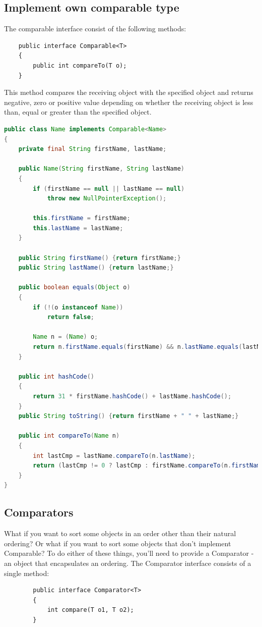 \subsection{Implement own comparable type}
The comparable interface consist of the following methods:
\begin{lstlisting}
	public interface Comparable<T>
	{
		public int compareTo(T o);
	}
\end{lstlisting}

This method compares the receiving object with the specified object and returns negative, zero or positive value depending on whether the receiving object is less than, equal or greater than the specified object.
\begin{lstlisting}[language = java, backgroundcolor = \color{white}]
public class Name implements Comparable<Name>
{
    private final String firstName, lastName;

    public Name(String firstName, String lastName)
    {
        if (firstName == null || lastName == null)
            throw new NullPointerException();

        this.firstName = firstName;
        this.lastName = lastName;
    }

    public String firstName() {return firstName;}
    public String lastName() {return lastName;}

    public boolean equals(Object o)
    {
        if (!(o instanceof Name))
            return false;

        Name n = (Name) o;
        return n.firstName.equals(firstName) && n.lastName.equals(lastName);
    }

    public int hashCode()
    {
    	return 31 * firstName.hashCode() + lastName.hashCode();
    }
    public String toString() {return firstName + " " + lastName;}

    public int compareTo(Name n)
    {
        int lastCmp = lastName.compareTo(n.lastName);
        return (lastCmp != 0 ? lastCmp : firstName.compareTo(n.firstName));
    }
}
\end{lstlisting}

\subsection{Comparators}
What if you want to sort some objects in an order other than their natural ordering? Or what if you want to sort some objects that don't implement Comparable? To do either of these things, you'll need to provide a Comparator - an object that encapsulates an ordering. The Comparator interface consists of a single method:
	\begin{lstlisting}
		public interface Comparator<T>
		{
			int compare(T o1, T o2);
		}
	\end{lstlisting}

